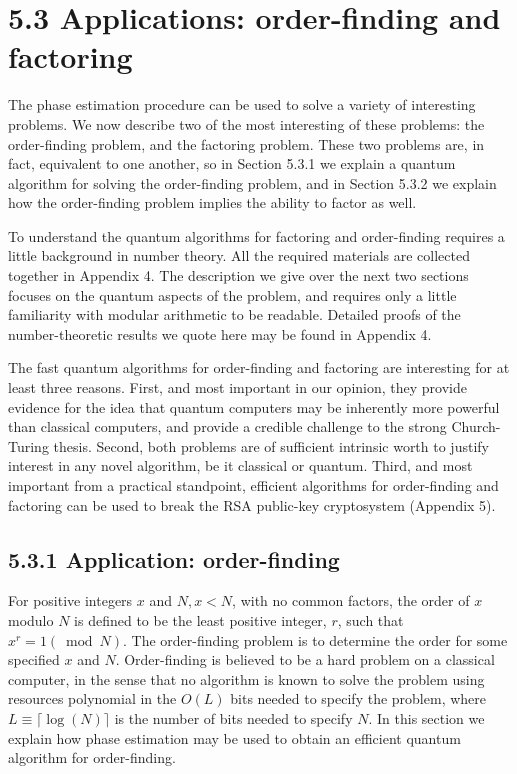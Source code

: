 \section*{5.3 Applications: order-finding and factoring}

The phase estimation procedure can be used to solve a variety of interesting problems. We now describe two of the most interesting of these problems: the order-finding problem, and the factoring problem. These two problems are, in fact, equivalent to one another, so in Section 5.3.1 we explain a quantum algorithm for solving the order-finding problem, and in Section 5.3.2 we explain how the order-finding problem implies the ability to factor as well.

To understand the quantum algorithms for factoring and order-finding requires a little background in number theory. All the required materials are collected together in Appendix 4. The description we give over the next two sections focuses on the quantum aspects of the problem, and requires only a little familiarity with modular arithmetic to be readable. Detailed proofs of the number-theoretic results we quote here may be found in Appendix 4.

The fast quantum algorithms for order-finding and factoring are interesting for at least three reasons. First, and most important in our opinion, they provide evidence for the idea that quantum computers may be inherently more powerful than classical computers, and provide a credible challenge to the strong Church-Turing thesis. Second, both problems are of sufficient intrinsic worth to justify interest in any novel algorithm, be it classical or quantum. Third, and most important from a practical standpoint, efficient algorithms for order-finding and factoring can be used to break the RSA public-key cryptosystem (Appendix 5).

\subsection*{5.3.1 Application: order-finding}

For positive integers $x$ and $N, x<N$, with no common factors, the order of $x$ modulo $N$ is defined to be the least positive integer, $r$, such that $x^{r}=1(\bmod N)$. The order-finding problem is to determine the order for some specified $x$ and $N$. Order-finding is believed to be a hard problem on a classical computer, in the sense that no algorithm is known to solve the problem using resources polynomial in the $O(L)$ bits needed to specify the problem, where $L \equiv\lceil\log (N)\rceil$ is the number of bits needed to specify $N$. In this section we explain how phase estimation may be used to obtain an efficient quantum algorithm for order-finding.

